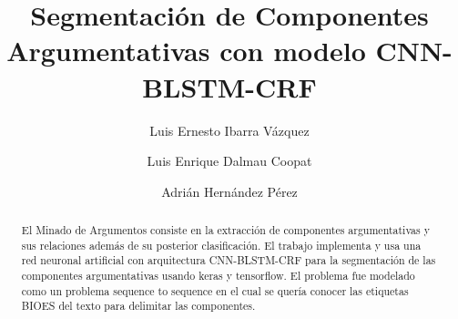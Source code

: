 \documentclass[runningheads]{llncs}
\begin{document}
%
\title{Segmentación de Componentes Argumentativas con modelo CNN-BLSTM-CRF}
%
%
\author{Luis Ernesto Ibarra Vázquez \and
Luis Enrique Dalmau Coopat \and 
Adrián Hernández Pérez}
%
%
%
\maketitle              %
%
\begin{abstract}

El Minado de Argumentos consiste en la extracción de componentes argumentativas 
y sus relaciones además de su posterior clasificación. El trabajo implementa 
y usa una red neuronal artificial con arquitectura CNN-BLSTM-CRF para la
segmentación de las componentes argumentativas usando keras y tensorflow. 
El problema fue modelado como un problema sequence to sequence en el cual se quería conocer las
etiquetas BIOES del texto para delimitar las componentes.


	
\end{abstract}
%
%
%
%
%
%
\end{document}
